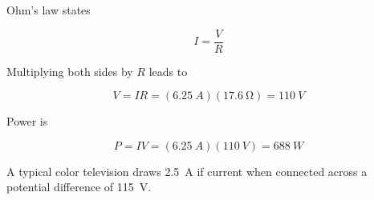\documentclass[]{exam}
\begin{document}
\begin{questions}
\begin{solution}
Ohm's law states

\begin{equation*}
    I = \frac{V}{R}
\end{equation*}

Multiplying both sides by $R$ leads to

\begin{equation*}
    V = IR = (\SI{6.25}{A})(\SI{17.6}{\ohm}) = \SI{110}{V}
\end{equation*}

Power is

\begin{equation*}
    P = IV = (\SI{6.25}{A})(\SI{110}{V}) = \boxed{\SI{688}{W}}
\end{equation*}
\end{solution}

\question
A typical color television draws \SI{2.5}{A} if current when connected across a potential difference of \SI{115}{V}. 

\end{questions}
\end{document}
